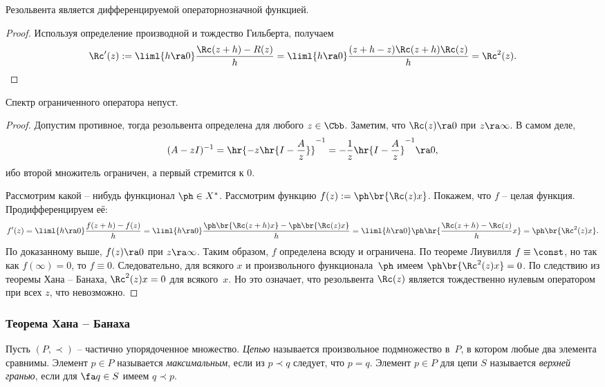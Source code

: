 \documentclass[a4paper]{article}
\begin{document}
\begin{lemma}
Резольвента является дифференцируемой операторнозначной функцией.
\end{lemma}
\begin{proof}
Используя определение производной и тождество Гильберта, получаем
$$\Rc'(z) := \liml{h \ra 0}\frac{\Rc(z+h) - R(z)}{h} = \liml{h\ra 0} \frac{(z+h-z)\Rc(z+h)\Rc(z)}{h} = \Rc^2(z).$$
\hfill\end{proof}

\begin{theorem}
Спектр ограниченного оператора непуст.
\end{theorem}
\begin{proof}
Допустим противное, тогда резольвента определена для любого $z \in \Cbb$.
Заметим, что $\Rc(z) \ra 0$ при $z \ra \infty$. В самом деле,
$$(A - zI)^{-1} = \hr{-z\hr{I - \frac{A}{z}}}^{-1} = -\frac{1}{z}\hr{I - \frac{A}{z}}^{-1} \ra 0,$$
ибо второй множитель ограничен, а первый стремится к $0$.

Рассмотрим какой -- нибудь функционал $\ph \in X^*$. Рассмотрим
функцию $f(z) := \ph\br{\Rc(z)x}$. Покажем, что $f$ -- целая функция.
Продифференцируем её:
$$f'(z) = \liml{h\ra0}\frac{f(z+h) - f(z)}{h} = \liml{h\ra0}\frac{\ph\br{\Rc(z+h)x} - \ph\br{\Rc(z)x}}{h} = \liml{h\ra0}\ph\hr{\frac{\Rc(z+h)-\Rc(z)}{h}x} = \ph\br{\Rc^2(z)x}.$$
По доказанному выше, $f(z) \ra 0$ при $z \ra \infty$. Таким образом, $f$ определена всюду
и ограничена. По теореме Лиувилля $f \equiv \const$, но так как
$f(\infty)=0$, то $f \equiv 0$. Следовательно, для всякого $x$ и произвольного функционала~$\ph$
имеем $\ph\br{\Rc^2(z)x}=0$. По следствию из теоремы Хана -- Банаха, $\Rc^2(z)x = 0$ для всякого~$x$.
Но это означает, что резольвента $\Rc(z)$ является тождественно нулевым оператором при
всех $z$, что невозможно.
\end{proof}


\subsubsection{Теорема Хана -- Банаха}

\begin{df}
Пусть $(P, \prec)$ -- частично упорядоченное множество. \emph{Цепью} называется
произвольное  подмножество в~$P$, в котором любые два элемента сравнимы.
Элемент $p \in P$ называется \emph{максимальным}, если из $p \prec q$ следует, что $p=q$.
Элемент $p\in P$ для цепи $S$ называется \emph{верхней гранью}, если для $\fa q \in S$ имеем $q \prec p$.
\end{df}
\end{document}
